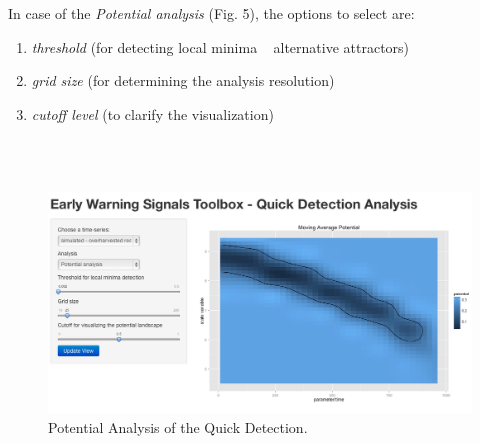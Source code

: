 \documentclass[12pt,a4paper,final]{article}
\begin{document}
\begin{doublespacing}
In case of the \textit{Potential analysis} (Fig. 5), the options to select are:
\begin{enumerate}
\item \textit{threshold} (for detecting local minima ~ alternative attractors)
\item \textit{grid size} (for determining the analysis resolution)
\item \textit{cutoff level} (to clarify the visualization)
\end{enumerate}\\
\\
\begin{figure}[ht]
\includegraphics[scale=0.4]{demo_potential.png}
\caption{Potential Analysis of the Quick Detection.}
\end{figure}

\end{doublespacing}
\end{document}
